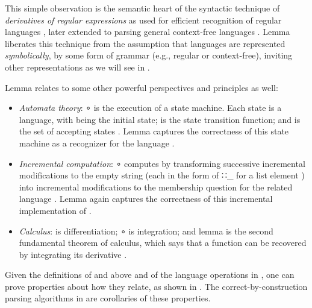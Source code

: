 \documentclass[acmsmall,screen]{acmart}
\begin{document}
This simple observation is the semantic heart of the syntactic technique of \emph{derivatives of regular expressions} as used for efficient recognition of regular languages \citep{Brzozowski64}, later extended to parsing general context-free languages \citep{Might2010YaccID}.
Lemma  liberates this technique from the assumption that languages are represented \emph{symbolically}, by some form of grammar (e.g., regular or context-free), inviting other representations as we will see in .

Lemma  relates to some other powerful perspectives and principles as well:
\begin{itemize}

\item 
\emph{Automata theory}: { \AF ∘   } is the execution of a state machine.
Each state is a language, with  being the initial state;  is the state transition function; and  is the set of accepting states \needcite{}.
Lemma  captures the correctness of this state machine as a recognizer for the language .

\item
\emph{Incremental computation}: { \AF ∘   } computes  by transforming successive incremental modifications to the empty string (each in the form of { \AIC ∷\_} for a list element ) into incremental modifications to the membership question for the related language {  } \needcite{}.
Lemma  again captures the correctness of this incremental implementation of .

\item 
\emph{Calculus}:  is differentiation; { \AF ∘   } is integration; and lemma  is the second fundamental theorem of calculus, which says that a function can be recovered by integrating its derivative \needcite{}.

\end{itemize}

Given the definitions of  and  above and of the language operations in , one can prove properties about how they relate, as shown in
.
The correct-by-construction parsing algorithms in  are corollaries of these properties.
\end{document}
